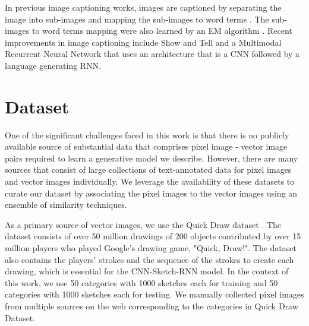 \documentclass{article}
\begin{document}
In previous image captioning works, images are captioned by separating the image into sub-images and mapping the sub-images to word terms \cite{Hironobu99}. The sub-images to word terms mapping were also learned by an EM algorithm \cite{Duygulu2002}. Recent improvements in image captioning include Show and Tell \cite{DBLP:journals/corr/VinyalsTBE14} and a Multimodal Recurrent Neural Network \cite{DBLP:journals/corr/KarpathyF14} that uses an architecture that is a CNN followed by a language generating RNN.


\section{Dataset}

One of the significant challenges faced in this work is that there is no publicly available source of substantial data that comprises pixel image - vector image pairs required to learn a generative model we describe. However, there are many sources that consist of large collections of text-annotated data for pixel images and vector images individually. We leverage the availability of these datasets to curate our dataset by associating the pixel images to the vector images using an ensemble of similarity techniques.

As a primary source of vector images, we use the Quick Draw dataset \cite{quickdraw}. The dataset consists of over 50 million drawings of 200 objects contributed by over 15 million players who played Google’s drawing game, "Quick, Draw!". The dataset also contains the players' strokes and the sequence of the strokes to create each drawing, which is essential for the CNN-Sketch-RNN model. In the context of this work, we use 50 categories with 1000 sketches each for training and 50 categories with 1000 sketches each for testing. We manually collected pixel images from multiple sources on the web corresponding to the categories in Quick Draw Dataset.
\end{document}
